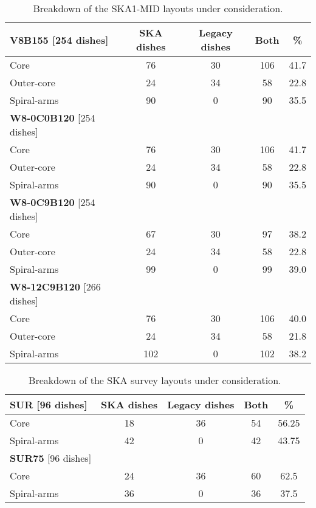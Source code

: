 \documentclass[sfheadings,a4paper,times,9pt,floats,floatfix]{article}
\begin{document}
\begin{table}[H]
\centering
 \tiny{
 \begin{tabular}{l|cccc}\hline
 {\bf V8B155} [254 dishes] & SKA dishes&  Legacy dishes & Both & \% \\\hline\hline
  Core & 76 & 30 & 106 & 41.7 \\
 Outer-core & 24 & 34 & 58 & 22.8 \\
 Spiral-arms & 90 & 0 & 90 & 35.5 \\\hline\hline
  {\bf W8-0C0B120} [254 dishes] &  & &  & \\\hline\hline
  Core & 76 & 30 & 106 & 41.7 \\
 Outer-core & 24 & 34 & 58 & 22.8 \\
 Spiral-arms & 90 & 0 & 90 & 35.5 \\\hline\hline
  {\bf W8-0C9B120} [254 dishes] &  & &  & \\\hline\hline
  Core & 67 & 30 & 97 & 38.2 \\
 Outer-core & 24 & 34 & 58 & 22.8 \\
 Spiral-arms & 99 & 0 & 99 & 39.0 \\\hline\hline
   {\bf W8-12C9B120} [266 dishes] &  & &  & \\\hline\hline
  Core & 76 & 30 & 106 & 40.0 \\
 Outer-core & 24 & 34 & 58 & 21.8 \\
 Spiral-arms & 102 & 0 & 102 & 38.2 \\\hline\hline
  \end{tabular}}
 \caption{Breakdown of the SKA1-MID layouts under consideration.}\label{tab:lay}
\end{table}

\begin{table}[H]
\centering
 \tiny{
 \begin{tabular}{l|cccc}\hline
 {\bf SUR} [96 dishes] & SKA dishes&  Legacy dishes & Both & \% \\\hline\hline
 Core & 18 & 36 & 54 & 56.25 \\
 Spiral-arms & 42 & 0 & 42 & 43.75 \\\hline\hline
 {\bf SUR75} [96 dishes] &  & &  & \\\hline\hline
 Core & 24 & 36 & 60 & 62.5 \\
 Spiral-arms & 36 & 0 & 36 & 37.5 \\\hline\hline
 \end{tabular}}
 \caption{Breakdown of the SKA survey layouts under consideration.}\label{tab:lay}
\end{table}
\end{document}
